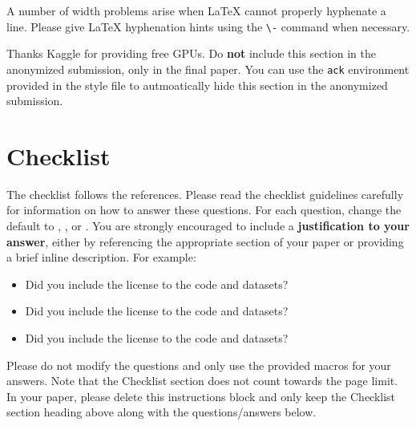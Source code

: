 \documentclass{article}
\begin{document}
A number of width problems arise when \LaTeX{} cannot properly hyphenate a
line. Please give LaTeX hyphenation hints using the \verb+\-+ command when
necessary.

\begin{ack}
Thanks Kaggle for providing free GPUs.
Do {\bf not} include this section in the anonymized submission, only in the final paper. You can use the \texttt{ack} environment provided in the style file to autmoatically hide this section in the anonymized submission.
\end{ack}







\section*{Checklist}


The checklist follows the references.  Please
read the checklist guidelines carefully for information on how to answer these
questions.  For each question, change the default \answerTODO{} to \answerYes{},
\answerNo{}, or \answerNA{}.  You are strongly encouraged to include a {\bf
justification to your answer}, either by referencing the appropriate section of
your paper or providing a brief inline description.  For example:
\begin{itemize}
  \item Did you include the license to the code and datasets? 
  \item Did you include the license to the code and datasets? 
  \item Did you include the license to the code and datasets? \answerNA{}
\end{itemize}
Please do not modify the questions and only use the provided macros for your
answers.  Note that the Checklist section does not count towards the page
limit.  In your paper, please delete this instructions block and only keep the
Checklist section heading above along with the questions/answers below.
\end{document}

